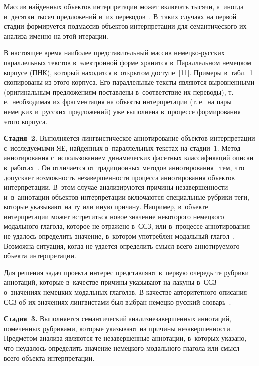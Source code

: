 \begin{multicols}{2}
  
  Массив найденных объектов интерпретации может включать тысячи, 
а~иногда и~десятки тысяч предложений и~их переводов~\cite{6-zat, 7-zat}. 
В~таких случаях на первой стадии формируется подмассив объектов 
интерпретации для семантического их анализа именно на этой итерации.
  
  В настоящее время наиболее представительный массив немецко-русских 
параллельных текс\-тов в~электронной форме хранится в~Параллельном 
немецком корпусе (ПНК), который находится в~открытом доступе~[11]. 
Примеры в~табл.~1 скопированы из этого корпуса. Его параллельные тексты 
являются выровненными (оригинальным предложениям поставлены 
в~соответствие их переводы), т.\,е.\ необходимая их фрагментация на объекты 
интерпретации (т.\,е.\ на пары немецких и~русских предложений) уже 
выполнена в~процессе формирования этого корпуса.
  
  \textbf{Стадия~2.} Выполняется лингвистическое аннотирование объектов 
интерпретации с~ис\-сле\-ду\-емы\-ми ЯЕ, найденных в~параллельных текстах на 
стадии~1. Метод аннотирования с~использованием динамических фасетных 
классификаций описан в~работах~\cite{2-zat, 3-zat, 4-zat, 10-zat, 12-zat}. Он 
отличается от традиционных методов аннотирования~\cite{13-zat} тем, что 
допускает возможность незавершенности процесса аннотирования объектов 
интерпретации. В~этом случае анализируются причины незавершенности 
и~в~аннотации объектов интерпретации включаются специальные руб\-ри\-ки-те\-ги, 
которые указывают на ту или иную причину. Например, в~объекте 
интерпретации может встретиться новое значение некоторого немецкого 
модального глагола, которое не отражено в~ССЗ, 
или в~процессе аннотирования не удалось определить значение, 
в~котором употреблен модальный глагол~\cite{10-zat}. Возможна ситуация, 
когда не удается определить смысл всего аннотируемого объекта 
интерпретации.
  
  Для решения задач проекта интерес представляют в~первую очередь те 
рубрики аннотаций, которые в~качестве причины указывают на лакуны в~ССЗ 
о~значениях немецких модальных глаголов. В качестве авторитетного 
описания ССЗ об их значениях лингвистами был выбран не\-мец\-ко-рус\-ский 
словарь~\cite{14-zat}.
  
  \textbf{Стадия~3.} Выполняется семантический анализ\linebreak незавершенных 
аннотаций, помеченных рубриками, которые указывают на причины 
не\-за\-вер\-шен\-ности. Предметом анализа являются те незавершенные аннотации, 
в~которых указано, что не\linebreak удалось определить значение немецкого модального 
глагола или смысл всего объекта интерпретации.
  

\end{multicols}
